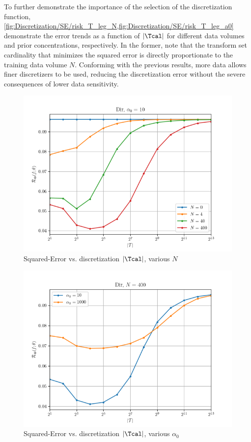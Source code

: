 \documentclass[12pt]{report}
\begin{document}
To further demonstrate the importance of the selection of the discretization function, \cref{fig:Discretization/SE/risk_T_leg_N,fig:Discretization/SE/risk_T_leg_a0} demonstrate the error trends as a function of $|\Tcal|$ for different data volumes and prior concentrations, respectively. In the former, note that the transform set cardinality that minimizes the squared error is directly proportionate to the training data volume $N$. Conforming with the previous results, more data allows finer discretizers to be used, reducing the discretization error without the severe consequences of lower data sensitivity.
\begin{figure}
	\centering
	\includegraphics[width=0.8\linewidth]{Discretization/SE/risk_T_leg_N.png}
	\caption{Squared-Error vs. discretization $|\Tcal|$, various $N$}
	\label{fig:Discretization/SE/risk_T_leg_N}
\end{figure} 
\begin{figure}
	\centering
	\includegraphics[width=0.8\linewidth]{Discretization/SE/risk_T_leg_a0.png}
	\caption{Squared-Error vs. discretization $|\Tcal|$, various $\alpha_0$}
	\label{fig:Discretization/SE/risk_T_leg_a0}
\end{figure} 
\end{document}
